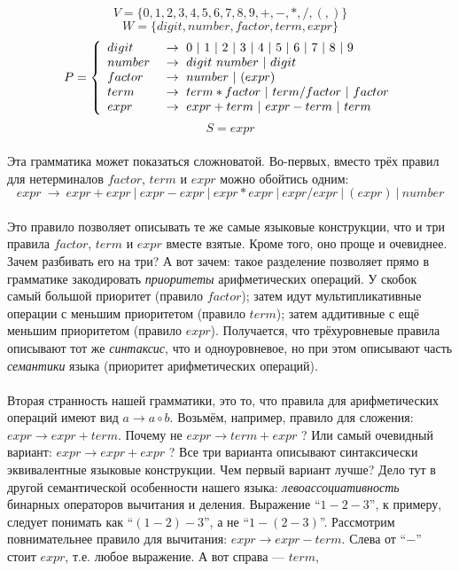 \documentclass[11pt]{book}
\begin{document}
$$V=\{0,1,2,3,4,5,6,7,8,9,+,-,*,/,(,)\}$$
$$W=\{digit, number, factor, term, expr\}$$
$$P=\left\{
\begin{array}{l l}
digit \  & \rightarrow \ 0 \ | \ 1 \ | \ 2 \ | \ 3 \ | \ 4 \ | \ 5 \ | \ 6 \ | \ 7 \ | \ 8 \ | \ 9
\\
number \  & \rightarrow \ digit \ number \ | \ digit
\\
factor \  & \rightarrow \ number \ | \ ( expr )
\\
term \  & \rightarrow \ term * factor \ | \ term / factor \ | \ factor
\\
expr \  & \rightarrow \ expr + term \ | \ expr - term \ | \ term
\end{array}
\right. $$
$$S=expr$$
\\
Эта грамматика может показаться сложноватой.
Во-первых, вместо трёх правил для нетерминалов $factor$, $term$ и $expr$ можно обойтись
одним:
$$expr \  \rightarrow \ expr + expr \ | \ expr - expr \ | \ expr * expr \ | \ expr / expr \ | \ ( expr ) \ | \ number$$
\\
Это правило позволяет описывать те же самые языковые конструкции, что и три правила $factor$, $term$ и $expr$ вместе взятые.
Кроме того, оно проще и очевиднее. Зачем разбивать его на три? А вот зачем:
такое разделение позволяет прямо в грамматике закодировать \emph{приоритеты} арифметических операций.
У скобок самый большой приоритет (правило $factor$); затем идут мультипликативные операции с меньшим приоритетом (правило $term$);
затем аддитивные с ещё меньшим приоритетом (правило $expr$). Получается, что трёхуровневые правила
описывают тот же \emph{синтаксис}, что и одноуровневое, но при этом описывают часть \emph{семантики} языка
(приоритет арифметических операций).
\\ \\
Вторая странность нашей грамматики, это то, что правила для арифметических операций имеют вид
$a \rightarrow a \circ b$. Возьмём, например, правило для сложения:
$expr \rightarrow expr + term$. Почему не $expr \rightarrow term + expr$ ? Или самый очевидный
вариант: $expr \rightarrow expr + expr$ ? Все три варианта описывают синтаксически эквивалентные языковые конструкции.
Чем первый вариант лучше? Дело тут в другой семантической особенности
нашего языка: \emph{левоассоциативность} бинарных операторов вычитания и деления.
Выражение ``$1 - 2 - 3$'', к примеру, следует понимать как ``$(1 - 2) - 3$'', а не ``$1 - (2 - 3)$''.
Рассмотрим повнимательнее правило для вычитания: $expr \rightarrow expr - term$.
Слева от ``$-$'' стоит $expr$, т.е. любое выражение. А вот справа --- $term$,
\end{document}
